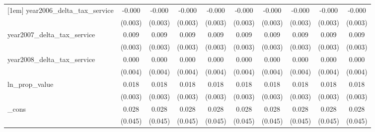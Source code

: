 {\begin{tabular}{l*{9}{c}}
[1em]
year2006_delta_tax_service&      -0.000         &      -0.000         &      -0.000         &      -0.000         &      -0.000         &      -0.000         &      -0.000         &      -0.000         &      -0.000         \\
            &     (0.003)         &     (0.003)         &     (0.003)         &     (0.003)         &     (0.003)         &     (0.003)         &     (0.003)         &     (0.003)         &     (0.003)         \\
[1em]
year2007_delta_tax_service&       0.009\sym{***}&       0.009\sym{***}&       0.009\sym{***}&       0.009\sym{***}&       0.009\sym{***}&       0.009\sym{***}&       0.009\sym{***}&       0.009\sym{***}&       0.009\sym{***}\\
            &     (0.003)         &     (0.003)         &     (0.003)         &     (0.003)         &     (0.003)         &     (0.003)         &     (0.003)         &     (0.003)         &     (0.003)         \\
[1em]
year2008_delta_tax_service&       0.000         &       0.000         &       0.000         &       0.000         &       0.000         &       0.000         &       0.000         &       0.000         &       0.000         \\
            &     (0.004)         &     (0.004)         &     (0.004)         &     (0.004)         &     (0.004)         &     (0.004)         &     (0.004)         &     (0.004)         &     (0.004)         \\
[1em]
ln_prop_value&       0.018\sym{***}&       0.018\sym{***}&       0.018\sym{***}&       0.018\sym{***}&       0.018\sym{***}&       0.018\sym{***}&       0.018\sym{***}&       0.018\sym{***}&       0.018\sym{***}\\
            &     (0.003)         &     (0.003)         &     (0.003)         &     (0.003)         &     (0.003)         &     (0.003)         &     (0.003)         &     (0.003)         &     (0.003)         \\
[1em]
_cons       &       0.028         &       0.028         &       0.028         &       0.028         &       0.028         &       0.028         &       0.028         &       0.028         &       0.028         \\
            &     (0.045)         &     (0.045)         &     (0.045)         &     (0.045)         &     (0.045)         &     (0.045)         &     (0.045)         &     (0.045)         &     (0.045)         \\

\end{tabular}}
